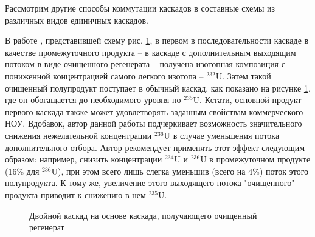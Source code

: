 Рассмотрим другие способы коммутации каскадов в составные схемы из различных видов единичных каскадов.

В работе \cite{palkinPurificationReprocessedUranium2016}, представившей схему рис. \ref{fig:int_double}, в первом в последовательности каскаде в качестве промежуточного продукта -- в каскаде с дополнительным выходящим потоком в виде очищенного регенерата -- получена изотопная композиция с пониженной концентрацией самого легкого изотопа --  $^{232}$U. Затем такой очищенный полупродукт поступает в обычный каскад, как показано на рисунке \ref{fig:int_double}, где он обогащается до необходимого уровня по $^{235}$U. Кстати, основной продукт первого каскада также может удовлетворять заданным свойствам коммерческого НОУ. Вдобавок, автор данной работы подчеркивает возможность значительного снижения нежелательной концентрации $^{236}$U в случае уменьшения потока дополнительного отбора. Автор рекомендует применять этот эффект следующим образом: например, снизить концентрации  $^{234}$U и  $^{236}$U в промежуточном продукте (16\% для  $^{236}$U), при этом всего лишь слегка уменьшив (всего на 4\%) поток этого полупродукта. К тому же, увеличение этого выходящего потока "очищенного" продукта приводит к снижению в нем $^{235}$U.
\begin{figure}[ht]
  \caption{Двойной каскад на основе каскада, получающего очищенный регенерат}\label{fig:int_double}
\end{figure}

